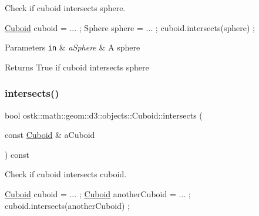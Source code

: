 Check if cuboid intersects sphere. 


\begin{DoxyCode}
\hyperlink{classostk_1_1math_1_1geom_1_1d3_1_1objects_1_1_cuboid_a1da071d7cbb0a694348628f098f77c5b}{Cuboid} cuboid = ... ;
Sphere sphere = ... ;
cuboid.intersects(sphere) ;
\end{DoxyCode}



\begin{DoxyParams}[1]{Parameters}
\mbox{\tt in}  & {\em a\+Sphere} & A sphere \\
\hline
\end{DoxyParams}
\begin{DoxyReturn}{Returns}
True if cuboid intersects sphere 
\end{DoxyReturn}
\mbox{\label{classostk_1_1math_1_1geom_1_1d3_1_1objects_1_1_cuboid_acc741e333008726d186887c49d14a00d}} 
\subsubsection{\texorpdfstring{intersects()}{intersects()}\hspace{0.1cm}{\footnotesize\ttfamily [8/9]}}
{\footnotesize\ttfamily bool ostk\+::math\+::geom\+::d3\+::objects\+::\+Cuboid\+::intersects (\begin{DoxyParamCaption}\item[{const \hyperlink{classostk_1_1math_1_1geom_1_1d3_1_1objects_1_1_cuboid}{Cuboid} \&}]{a\+Cuboid }\end{DoxyParamCaption}) const}



Check if cuboid intersects cuboid. 


\begin{DoxyCode}
\hyperlink{classostk_1_1math_1_1geom_1_1d3_1_1objects_1_1_cuboid_a1da071d7cbb0a694348628f098f77c5b}{Cuboid} cuboid = ... ;
\hyperlink{classostk_1_1math_1_1geom_1_1d3_1_1objects_1_1_cuboid_a1da071d7cbb0a694348628f098f77c5b}{Cuboid} anotherCuboid = ... ;
cuboid.intersects(anotherCuboid) ;
\end{DoxyCode}



